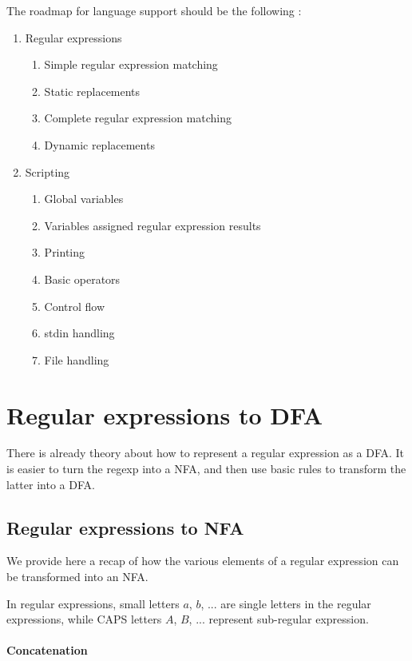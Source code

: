 \documentclass[11pt,a4paper]{report}
\begin{document}
The roadmap for language support should be the following :
\begin{enumerate}
\item Regular expressions
	\begin{enumerate}
	\item Simple regular expression matching
	\item Static replacements
	\item Complete regular expression matching
	\item Dynamic replacements	
	\end{enumerate}
\item Scripting
	\begin{enumerate}
	\item Global variables
	\item Variables assigned regular expression results
	\item Printing
	\item Basic operators
	\item Control flow
	\item stdin handling
	\item File handling
	\end{enumerate}
\end{enumerate}

\chapter{Regular expressions to DFA}

There is already theory about how to represent a regular expression as a DFA. It is easier to turn the regexp into a NFA, and then use basic rules to transform the latter into a DFA.

\section{Regular expressions to NFA}

\label{regexptonfa}

We provide here a recap of how the various elements of a regular expression can be transformed into an NFA.

In regular expressions, small letters $a$, $b$, ... are single letters in the regular expressions, while CAPS letters $A$, $B$, ... represent sub-regular expression.

\subsubsection{Concatenation}
\end{document}
